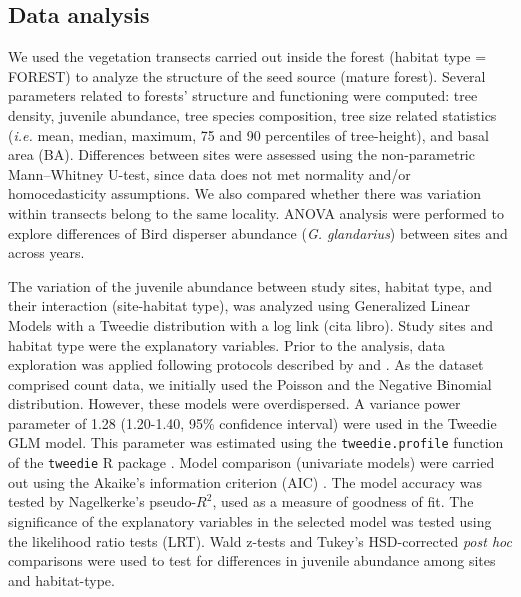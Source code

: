 \subsection{Data analysis}\label{sec:coloniza:analysis}
We used the vegetation transects carried out inside the forest (habitat type = FOREST) to analyze the structure of the seed source (mature forest). Several parameters related to forests' structure and functioning were computed: tree density, juvenile abundance, tree species composition, tree size related statistics (\emph{i.e.} mean, median, maximum, 75 and 90 percentiles of tree-height), and basal area (BA). Differences between sites were assessed using the non-parametric Mann–Whitney U-test, since data does not met normality and/or homocedasticity assumptions. We also compared whether there was variation within transects belong to the same locality. ANOVA analysis were performed to explore differences of Bird disperser abundance (\emph{G. glandarius}) between sites and across years. 

The variation of the juvenile abundance between study sites, habitat type, and their interaction (site-habitat type), was analyzed using Generalized Linear Models with a Tweedie distribution with a log link (cita libro). Study sites and habitat type were the explanatory variables. Prior to the analysis, data exploration was applied following protocols described by \citet{Zuuretal2010ProtocolData} and \citet{IenoZuur2015BeginnerGuide}. As the dataset comprised count data, we initially used the Poisson and the Negative Binomial distribution. However, these models were overdispersed. A variance power parameter of 1.28 (1.20-1.40, 95\% confidence interval) were used in the Tweedie GLM model. This parameter was estimated using the \texttt{tweedie.profile} function of the \texttt{tweedie} R package \autocites{DunnSmyth2005SeriesEvaluation,Dunn2017Tweedie}. Model comparison (univariate models) were carried out using the Akaike's information criterion (AIC) \autocites{BurnhamAnderson2010ModelSelection}. The model accuracy was tested by Nagelkerke's pseudo-$R^2$, used as a measure of goodness of fit. The significance of the explanatory variables in the selected model was tested using the likelihood ratio tests (LRT). Wald z-tests and Tukey's HSD-corrected \emph{post hoc} comparisons were used to test for differences in juvenile abundance among sites and habitat-type. 

